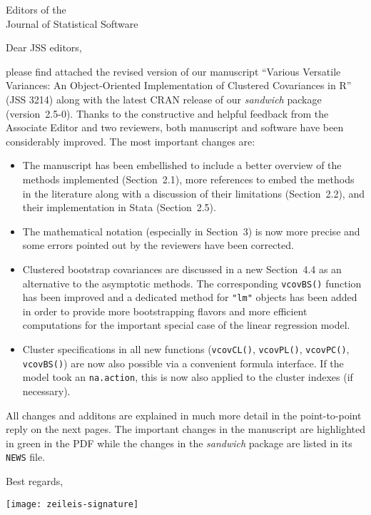 \documentclass[american,foldmarks=false]{uibklttr}
\let\code=\texttt
\begin{document}
\begin{letter}{
Editors of the\\
Journal of Statistical Software}



\opening{Dear JSS editors,}

please find attached the revised version of our manuscript ``Various Versatile
Variances: An Object-Oriented Implementation of Clustered Covariances in R''
(JSS 3214) along with the latest CRAN release of our \emph{sandwich} package
(version~2.5-0). Thanks to the constructive and helpful feedback from the
Associate Editor and two reviewers, both manuscript and software have been
considerably improved. The most important changes are:
\begin{itemize}

\item The manuscript has been embellished to include a better overview of
  the methods implemented (Section~2.1), more references to embed the methods
  in the literature along with a discussion of their limitations (Section~2.2),
  and their implementation in Stata (Section~2.5).

\item The mathematical notation (especially in Section~3) is now more
  precise and some errors pointed out by the reviewers have been corrected.

\item Clustered bootstrap covariances are discussed in a new Section~4.4
  as an alternative to the asymptotic methods. The corresponding \code{vcovBS()}
  function has been improved and a dedicated method for \code{"lm"} objects
  has been added in order to provide more bootstrapping flavors and more
  efficient computations for the important special case of the linear regression
  model.
  
\item Cluster specifications in all new functions (\code{vcovCL()},
  \code{vcovPL()}, \code{vcovPC()}, \code{vcovBS()}) are now also possible
  via a convenient formula interface. If the model took an \code{na.action},
  this is now also applied to the cluster indexes (if necessary).

\end{itemize}

All changes and additons are explained in much more detail in the
point-to-point reply on the next pages. The important changes in the manuscript
are highlighted in green in the PDF while the changes in the \emph{sandwich}
package are listed in its \code{NEWS} file.

\closing{Best regards,
\vspace*{1cm}
}

\vspace*{-2.8cm}
\hspace*{-0.3cm}\texttt{[image: zeileis-signature]}

\end{letter}
\end{document}
